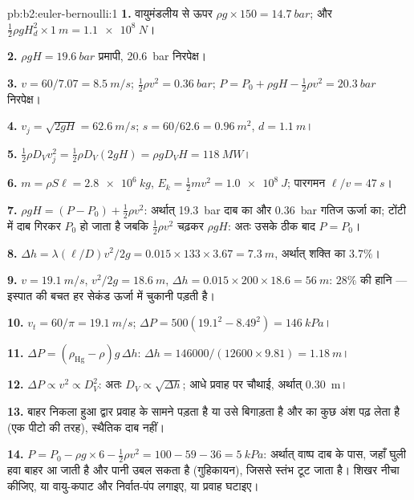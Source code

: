 \begin{solution}{pb:b2:euler-bernoulli:1}
\textbf{1.} वायुमंडलीय से ऊपर $\rho g \times 150 = \qty{14.7}{bar}$; और $\tfrac12\rho gH_d^2
\times \qty{1}{m} = \qty{1.1e8}{N}$।

\textbf{2.} $\rho gH = \qty{19.6}{bar}$ प्रमापी, \qty{20.6}{bar} निरपेक्ष।

\textbf{3.} $v = 60/7.07 = \qty{8.5}{m/s}$; $\tfrac12\rho v^2 = \qty{0.36}{bar}$; $P =
P_0 + \rho gH - \tfrac12\rho v^2 = \qty{20.3}{bar}$ निरपेक्ष।

\textbf{4.} $v_j = \sqrt{2gH} = \qty{62.6}{m/s}$; $s = 60/62.6 = \qty{0.96}{m^2}$, $d =
\qty{1.1}{m}$।

\textbf{5.} $\tfrac12\rho D_Vv_j^2 = \tfrac12\rho D_V(2gH) = \rho gD_VH = \qty{118}{MW}$।

\textbf{6.} $m = \rho S\ell = \qty{2.8e6}{kg}$, $E_k = \tfrac12mv^2 = \qty{1.0e8}{J}$;
पारगमन $\ell/v = \qty{47}{s}$।

\textbf{7.} $\rho gH = (P - P_0) + \tfrac12\rho v^2$: अर्थात् \qty{19.3}{bar} दाब का
और \qty{0.36}{bar} गतिज ऊर्जा का; टोंटी में दाब गिरकर
$P_0$ हो जाता है जबकि $\tfrac12\rho v^2$ चढ़कर $\rho gH$: अतः उसके ठीक बाद $P = P_0$।

\textbf{8.} $\Delta h = \lambda(\ell/D)v^2/2g = 0.015 \times 133 \times 3.67 = \qty{7.3}{m}$,
अर्थात् शक्ति का $3.7\%$।

\textbf{9.} $v = \qty{19.1}{m/s}$, $v^2/2g = \qty{18.6}{m}$, $\Delta h = 0.015 \times 200 \times
18.6 = \qty{56}{m}$: $28\%$ की हानि --- इस्पात की बचत हर सेकंड
ऊर्जा में चुकानी पड़ती है।

\textbf{10.} $v_t = 60/\pi = \qty{19.1}{m/s}$; $\Delta P = 500(19.1^2 - 8.49^2) =
\qty{146}{kPa}$।

\textbf{11.} $\Delta P = (\rho_{\text{Hg}} - \rho)g\,\Delta h$: $\Delta h = 146000/(12600
\times 9.81) = \qty{1.18}{m}$।

\textbf{12.} $\Delta P \propto v^2 \propto D_V^2$: अतः $D_V \propto \sqrt{\Delta h}$; आधे
प्रवाह पर चौथाई, अर्थात् \qty{0.30}{m}।

\textbf{13.} बाहर निकला हुआ द्वार प्रवाह के सामने पड़ता है या उसे बिगाड़ता
है और  का कुछ अंश पढ़ लेता है (एक पीटो की तरह), स्थैतिक दाब नहीं।

\textbf{14.} $P = P_0 - \rho g \times 6 - \tfrac12\rho v^2 = 100 - 59 - 36 = \qty{5}{kPa}$:
अर्थात् वाष्प दाब के पास, जहाँ घुली हवा बाहर आ जाती है और पानी उबल
सकता है (गुहिकायन), जिससे स्तंभ टूट जाता है। शिखर नीचा कीजिए, या वायु-कपाट
और निर्वात-पंप लगाइए, या प्रवाह घटाइए।


\end{solution}
